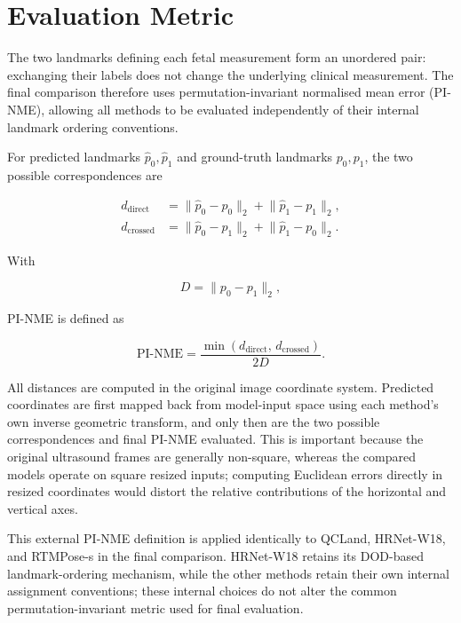 
\section{Evaluation Metric}
\label{sec:setup-nme}

The two landmarks defining each fetal measurement form an unordered
pair: exchanging their labels does not change the underlying clinical
measurement. The final comparison therefore uses
permutation-invariant normalised mean error (PI-NME), allowing all
methods to be evaluated independently of their internal landmark
ordering conventions.

For predicted landmarks $\hat{p}_0,\hat{p}_1$ and ground-truth
landmarks $p_0,p_1$, the two possible correspondences are

\begin{align}
  d_{\text{direct}}
  &=
  \lVert \hat{p}_0 - p_0 \rVert_2
  +
  \lVert \hat{p}_1 - p_1 \rVert_2,
  \\
  d_{\text{crossed}}
  &=
  \lVert \hat{p}_0 - p_1 \rVert_2
  +
  \lVert \hat{p}_1 - p_0 \rVert_2.
\end{align}

With

\begin{equation}
  D = \lVert p_0 - p_1 \rVert_2,
\end{equation}

PI-NME is defined as

\begin{equation}
  \label{eq:pi-nme}
  \mathrm{PI\text{-}NME}
  =
  \frac{
    \min(d_{\text{direct}},\,d_{\text{crossed}})
  }{2D}.
\end{equation}

All distances are computed in the original image coordinate system.
Predicted coordinates are first mapped back from model-input space
using each method's own inverse geometric transform, and only then
are the two possible correspondences and final PI-NME evaluated.
This is important because the original ultrasound frames are
generally non-square, whereas the compared models operate on square
resized inputs; computing Euclidean errors directly in resized
coordinates would distort the relative contributions of the
horizontal and vertical axes.

This external PI-NME definition is applied identically to QCLand,
HRNet-W18, and RTMPose-s in the final comparison. HRNet-W18 retains
its DOD-based landmark-ordering mechanism, while the other methods
retain their own internal assignment conventions; these internal
choices do not alter the common permutation-invariant metric used
for final evaluation.


